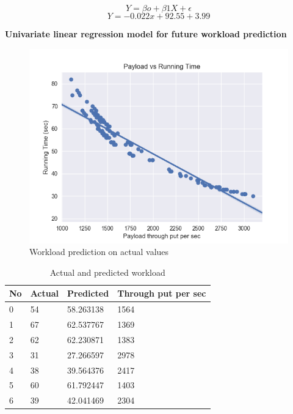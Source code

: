\documentclass[12pt, letterpaper, titlepage]{report}
\begin{document}
$$ 
Y = \beta o + \beta1X + \epsilon 
$$
$$ 
Y = -0.022x + 92.55 + 3.99
$$

\begin{center}
 \textbf{Univariate linear regression model for future workload prediction}
\end{center}


\begin{figure}[h]
	\centering
	\includegraphics{workloadPrediction100.png}
	\caption{Workload prediction on actual values}
	\label{fig_workloadPred100}
\end{figure}


\begin{table}[h!]
	\centering
	\begin{tabular}{|l|l|l|l|}
		\hline
		\textbf{No} &     \textbf{Actual} &   \textbf{Predicted} &   \textbf{Through put per sec} \\ \hline
		0   &    54 & 58.263138   &              1564 \\ \hline
		1   &   67 & 62.537767       &          1369 \\ \hline
		2   &   62 & 62.230871     &            1383 \\ \hline
		3   &    31 & 27.266597     &            2978 \\ \hline
		4   &    38 & 39.564376    &             2417 \\ \hline
		5   &    60 & 61.792447    &             1403 \\ \hline
		6   &    39 & 42.041469    &             2304 \\ \hline
	\end{tabular}
	\caption{Actual and predicted workload}
	\label{actualPred100}
\end{table}
\end{document}
